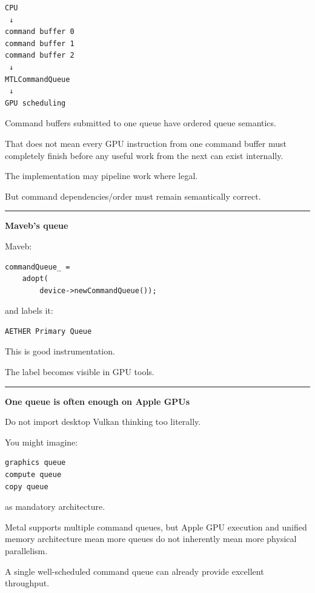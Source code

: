 \begin{verbatim}
CPU
 ↓
command buffer 0
command buffer 1
command buffer 2
 ↓
MTLCommandQueue
 ↓
GPU scheduling
\end{verbatim}

Command buffers submitted to one queue have ordered queue semantics.

That does not mean every GPU instruction from one command buffer must completely finish before any useful work from the next can exist internally.

The implementation may pipeline work where legal.

But command dependencies/order must remain semantically correct.

\begin{center}\rule{0.5\linewidth}{0.5pt}\end{center}

\textbf{Maveb's queue}

Maveb:

\begin{verbatim}
commandQueue_ =
    adopt(
        device->newCommandQueue());
\end{verbatim}

and labels it:

\begin{verbatim}
AETHER Primary Queue
\end{verbatim}

This is good instrumentation.

The label becomes visible in GPU tools.

\begin{center}\rule{0.5\linewidth}{0.5pt}\end{center}

\textbf{One queue is often enough on Apple GPUs}

Do not import desktop Vulkan thinking too literally.

You might imagine:

\begin{verbatim}
graphics queue
compute queue
copy queue
\end{verbatim}

as mandatory architecture.

Metal supports multiple command queues, but Apple GPU execution and unified memory architecture mean more queues do not inherently mean more physical parallelism.

A single well-scheduled command queue can already provide excellent throughput.

